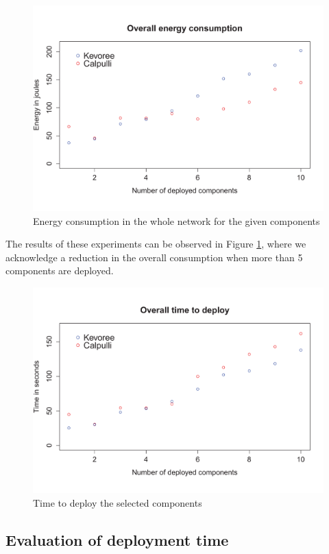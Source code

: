 \begin{figure}[htb]
	\centering
	\includegraphics[width=0.95\columnwidth]{chapters/calpulli.images/energyWithFonts.pdf}
	\caption{Energy consumption in the whole network for the given components} \label{fig:Energy}
\end{figure}

The results of these experiments can be observed in Figure \ref{fig:Energy}, where we acknowledge a reduction in the overall consumption when more than 5 components are deployed.

\begin{figure}[htb]
	\centering
	\includegraphics[width=0.95\columnwidth]{chapters/calpulli.images/timeWithFonts.pdf}
	\caption{Time to deploy the selected components} \label{fig:Time}
\end{figure}

\subsection{Evaluation of deployment time}

